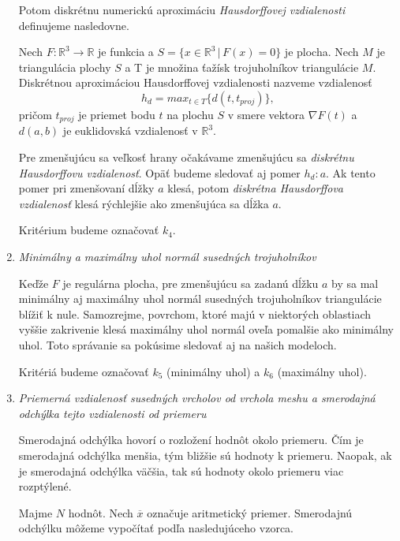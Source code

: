 \begin{enumerate}
{    Potom diskrétnu numerickú aproximáciu \textit{Hausdorffovej vzdialenosti} definujeme nasledovne.
    \begin{definition}
        Nech $F:\mathbb{R}^3 \to \mathbb{R}$ je funkcia a $S = \{x \in \mathbb{R}^3 \, | \, F(x)=0 \}$ 
        je plocha. Nech $M$ je triangulácia plochy $S$
        a T je množina ťažísk trojuholníkov triangulácie $M$.
        Diskrétnou aproximáciou Hausdorffovej vzdialenosti nazveme vzdialenosť
        \begin{equation}
            h_d = max_{t \in T} \big \{ d(t, t_{proj})\big \},
        \end{equation}
        pričom $t_{proj}$ je priemet bodu $t$ na plochu $S$ v smere vektora $\nabla F(t)$ a
        $d(a, b)$ je euklidovská vzdialenosť v $\mathbb{R}^3$.
    \end{definition}

    Pre zmenšujúcu sa veľkosť hrany očakávame zmenšujúcu sa \textit{diskrétnu Hausdorffovu vzdialenosť}.
    Opäť budeme sledovať aj pomer $h_d : a$. Ak tento pomer pri zmenšovaní dĺžky $a$ klesá, potom 
    \textit{diskrétna Hausdorffova vzdialenosť} klesá rýchlejšie ako zmenšujúca sa dĺžka $a$.

    Kritérium budeme označovať $k_4$.
}
\item{
    \textit{Minimálny a maximálny uhol normál susedných trojuholníkov}

    Keďže $F$ je regulárna plocha, pre zmenšujúcu sa zadanú dĺžku $a$ by sa mal minimálny aj maximálny 
    uhol normál susedných trojuholníkov triangulácie blížiť k nule. Samozrejme, povrchom, ktoré majú 
    v niektorých oblastiach vyššie zakrivenie klesá maximálny uhol normál oveľa pomalšie ako minimálny
    uhol. Toto správanie sa pokúsime sledovať aj na našich modeloch.

    Kritériá budeme označovať $k_5$ (minimálny uhol) a $k_6$ (maximálny uhol).
}
\item{
    \textit{Priemerná vzdialenosť susedných vrcholov od vrchola meshu a smerodajná odchýlka tejto vzdialenosti od priemeru}

    Smerodajná odchýlka hovorí o rozložení hodnôt okolo priemeru. Čím je smerodajná odchýlka menšia, 
    tým bližšie sú hodnoty k priemeru. Naopak, ak je smerodajná odchýlka väčšia, tak sú hodnoty okolo
    priemeru viac rozptýlené.
    
    Majme $N$ hodnôt. Nech $\overline{x}$ označuje aritmetický priemer. 
    Smerodajnú odchýlku môžeme vypočítať podľa nasledujúceho vzorca.

}
\end{enumerate}

